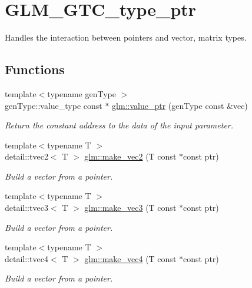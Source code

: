 \hypertarget{group__gtc__type__ptr}{\section{G\-L\-M\-\_\-\-G\-T\-C\-\_\-type\-\_\-ptr}
\label{group__gtc__type__ptr}
}


Handles the interaction between pointers and vector, matrix types.  


\subsection*{Functions}
\begin{DoxyCompactItemize}
\item 
{\footnotesize template$<$typename gen\-Type $>$ }\\gen\-Type\-::value\-\_\-type const $\ast$ \hyperlink{group__gtc__type__ptr_ga140f5c39d519780c61e02e47daa7d18a}{glm\-::value\-\_\-ptr} (gen\-Type const \&vec)
\begin{DoxyCompactList}\small\item\em Return the constant address to the data of the input parameter. \end{DoxyCompactList}\item 
{\footnotesize template$<$typename T $>$ }\\detail\-::tvec2$<$ T $>$ \hyperlink{group__gtc__type__ptr_ga60e64ef452541f76f7b5b4e04b18062a}{glm\-::make\-\_\-vec2} (T const $\ast$const ptr)
\begin{DoxyCompactList}\small\item\em Build a vector from a pointer. \end{DoxyCompactList}\item 
{\footnotesize template$<$typename T $>$ }\\detail\-::tvec3$<$ T $>$ \hyperlink{group__gtc__type__ptr_ga0e2e7d24d80edb5a95a86c6a76ae5a41}{glm\-::make\-\_\-vec3} (T const $\ast$const ptr)
\begin{DoxyCompactList}\small\item\em Build a vector from a pointer. \end{DoxyCompactList}\item 
{\footnotesize template$<$typename T $>$ }\\detail\-::tvec4$<$ T $>$ \hyperlink{group__gtc__type__ptr_ga5d91c17941c35effc46b335ad6fb6252}{glm\-::make\-\_\-vec4} (T const $\ast$const ptr)
\begin{DoxyCompactList}\small\item\em Build a vector from a pointer. \end{DoxyCompactList}\item 

\end{DoxyCompactItemize}
